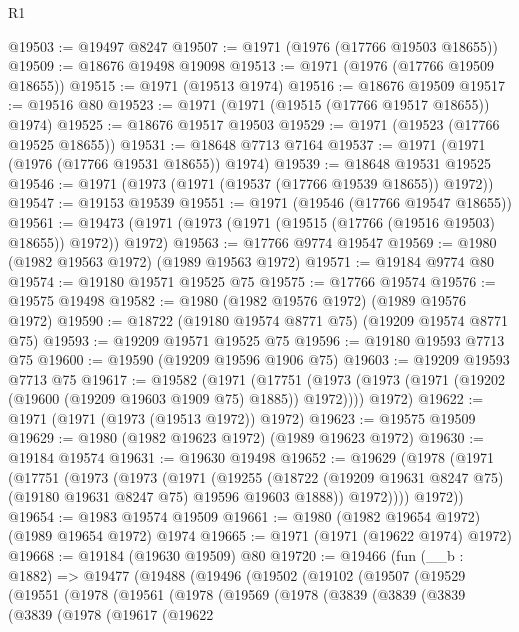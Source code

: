 \begin{lexlean}{R1}
\begin{coremodule}
@19503 := @19497 @8247
@19507 := @1971 (@1976 (@17766 @19503 @18655))
@19509 := @18676 @19498 @19098
@19513 := @1971 (@1976 (@17766 @19509 @18655))
@19515 := @1971 (@19513 @1974)
@19516 := @18676 @19509
@19517 := @19516 @80
@19523 := @1971 (@1971 (@19515 (@17766 @19517 @18655)) @1974)
@19525 := @18676 @19517 @19503
@19529 := @1971 (@19523 (@17766 @19525 @18655))
@19531 := @18648 @7713 @7164
@19537 := @1971 (@1971 (@1976 (@17766 @19531 @18655)) @1974)
@19539 := @18648 @19531 @19525
@19546 := @1971 (@1973 (@1971 (@19537 (@17766 @19539 @18655)) @1972))
@19547 := @19153 @19539
@19551 := @1971 (@19546 (@17766 @19547 @18655))
@19561 := @19473 (@1971 (@1973 (@1971 (@19515 (@17766 (@19516 @19503) @18655)) @1972)) @1972)
@19563 := @17766 @9774 @19547
@19569 := @1980 (@1982 @19563 @1972) (@1989 @19563 @1972)
@19571 := @19184 @9774 @80
@19574 := @19180 @19571 @19525 @75
@19575 := @17766 @19574
@19576 := @19575 @19498
@19582 := @1980 (@1982 @19576 @1972) (@1989 @19576 @1972)
@19590 := @18722 (@19180 @19574 @8771 @75) (@19209 @19574 @8771 @75)
@19593 := @19209 @19571 @19525 @75
@19596 := @19180 @19593 @7713 @75
@19600 := @19590 (@19209 @19596 @1906 @75)
@19603 := @19209 @19593 @7713 @75
@19617 := @19582
    (@1971
      (@17751 (@1973 (@1973 (@1971 (@19202 (@19600 (@19209 @19603 @1909 @75) @1885)) @1972))))
      @1972)
@19622 := @1971 (@1971 (@1973 (@19513 @1972)) @1972)
@19623 := @19575 @19509
@19629 := @1980 (@1982 @19623 @1972) (@1989 @19623 @1972)
@19630 := @19184 @19574
@19631 := @19630 @19498
@19652 := @19629
    (@1978
      (@1971
        (@17751
          (@1973
            (@1973
              (@1971
                (@19255
                  (@18722 (@19209 @19631 @8247 @75) (@19180 @19631 @8247 @75) @19596 @19603 @1888))
                @1972))))
        @1972))
@19654 := @1983 @19574 @19509
@19661 := @1980 (@1982 @19654 @1972) (@1989 @19654 @1972) @1974
@19665 := @1971 (@1971 (@19622 @1974) @1972)
@19668 := @19184 (@19630 @19509) @80
@19720 := @19466
    (fun (__b : @1882) =>
    @19477
      (@19488
        (@19496
          (@19502
            (@19102
              (@19507
                (@19529
                  (@19551
                    (@1978
                      (@19561
                        (@1978
                          (@19569
                            (@1978
                              (@3839
                                (@3839
                                  (@3839
                                    (@3839
                                      (@1978
                                        (@19617
                                          (@19622

\end{coremodule}
\end{lexlean}
